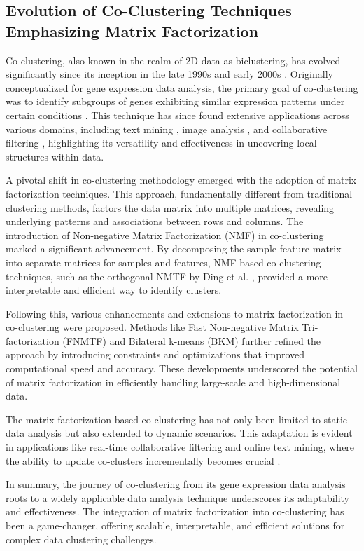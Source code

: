 \documentclass{article}
\begin{document}
\subsection{Evolution of Co-Clustering Techniques Emphasizing Matrix Factorization}

Co-clustering, also known in the realm of 2D data as biclustering, has evolved significantly since its inception in the late 1990s and early 2000s \cite{cheng2000BiclusteringExpressionData}. Originally conceptualized for gene expression data analysis, the primary goal of co-clustering was to identify subgroups of genes exhibiting similar expression patterns under certain conditions \cite{madeira2004BiclusteringAlgorithmsBiological}. This technique has since found extensive applications across various domains, including text mining \cite{song2013ConstrainedTextCoclustering, siklosi2012ContentbasedTrustBias}, image analysis \cite{khan2020CoClusteringRevealSalient}, and collaborative filtering \cite{daruru2009PervasiveParallelismData}, highlighting its versatility and effectiveness in uncovering local structures within data.

A pivotal shift in co-clustering methodology emerged with the adoption of matrix factorization techniques. This approach, fundamentally different from traditional clustering methods, factors the data matrix into multiple matrices, revealing underlying patterns and associations between rows and columns. The introduction of Non-negative Matrix Factorization (NMF) in co-clustering marked a significant advancement. By decomposing the sample-feature matrix into separate matrices for samples and features, NMF-based co-clustering techniques, such as the orthogonal NMTF by Ding et al. \cite{ding2005OrthogonalNonnegativeMatrix}, provided a more interpretable and efficient way to identify clusters.

Following this, various enhancements and extensions to matrix factorization in co-clustering were proposed. Methods like Fast Non-negative Matrix Tri-factorization (FNMTF) \cite{wang2019DualHypergraphRegularized} and Bilateral k-means (BKM) \cite{han2020BilateralKMeans} further refined the approach by introducing constraints and optimizations that improved computational speed and accuracy. These developments underscored the potential of matrix factorization in efficiently handling large-scale and high-dimensional data.

The matrix factorization-based co-clustering has not only been limited to static data analysis but also extended to dynamic scenarios. This adaptation is evident in applications like real-time collaborative filtering and online text mining, where the ability to update co-clusters incrementally becomes crucial \cite{daruru2009PervasiveParallelismData}.

In summary, the journey of co-clustering from its gene expression data analysis roots to a widely applicable data analysis technique underscores its adaptability and effectiveness. The integration of matrix factorization into co-clustering has been a game-changer, offering scalable, interpretable, and efficient solutions for complex data clustering challenges.
\end{document}

